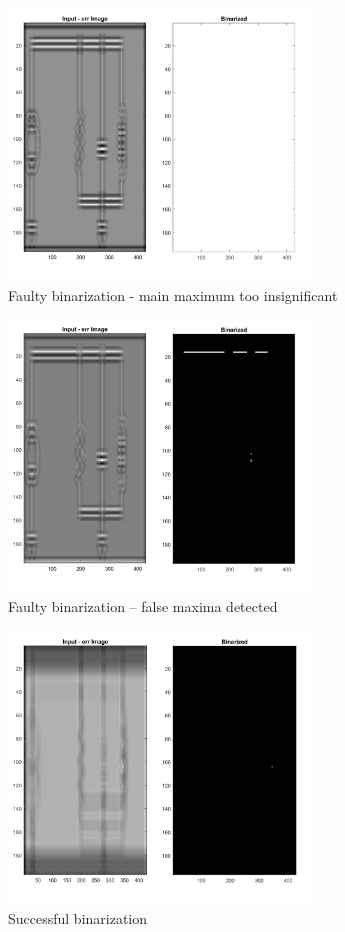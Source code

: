 \documentclass[10pt,twocolumn,letterpaper]{article}
\begin{document}
\begin{figure}[!ht]
\includegraphics[width = 3.2in]{img/detMX1.png}
\caption{Faulty binarization - main maximum too insignificant}
\label{fig:detMX1}
\end{figure}
\par

\begin{figure}[!ht]
\includegraphics[width = 3.2in]{img/detMX2.png}
\caption{Faulty binarization – false maxima detected}
\label{fig:detMX2}
\end{figure}
\par

\begin{figure}[!ht]
\includegraphics[width = 3.2in]{img/detMX3.png}
\caption{Successful binarization}
\label{fig:detMX3}
\end{figure}
\end{document}
